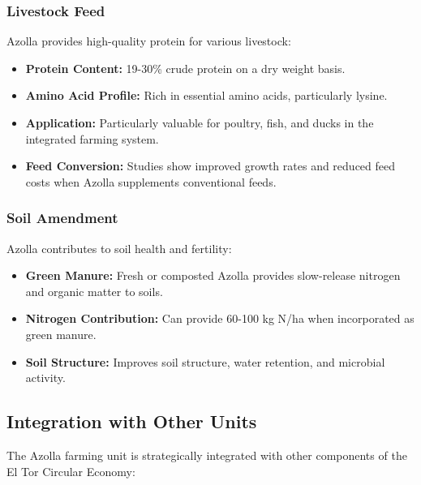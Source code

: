 \subsubsection{Livestock Feed}

Azolla provides high-quality protein for various livestock:

\begin{itemize}
    \item \textbf{Protein Content:} 19-30\% crude protein on a dry weight basis.
    
    \item \textbf{Amino Acid Profile:} Rich in essential amino acids, particularly lysine.
    
    \item \textbf{Application:} Particularly valuable for poultry, fish, and ducks in the integrated farming system.
    
    \item \textbf{Feed Conversion:} Studies show improved growth rates and reduced feed costs when Azolla supplements conventional feeds.
\end{itemize}

\subsubsection{Soil Amendment}

Azolla contributes to soil health and fertility:

\begin{itemize}
    \item \textbf{Green Manure:} Fresh or composted Azolla provides slow-release nitrogen and organic matter to soils.
    
    \item \textbf{Nitrogen Contribution:} Can provide 60-100 kg N/ha when incorporated as green manure.
    
    \item \textbf{Soil Structure:} Improves soil structure, water retention, and microbial activity.
\end{itemize}

\subsection{Integration with Other Units}

The Azolla farming unit is strategically integrated with other components of the El Tor Circular Economy:

